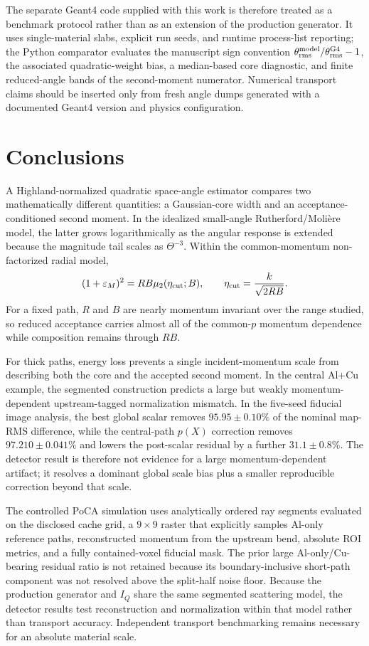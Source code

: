 \documentclass[aps,pra,reprint,longbibliography,floatfix]{revtex4-2}
\newcommand{\epsM}{\ensuremath{\varepsilon_M}}
\newcommand{\thetarms}{\ensuremath{\theta_{\mathrm{rms}}}}
\begin{document}
The separate Geant4 code supplied with this work is therefore treated as a benchmark protocol rather than as an extension of the production generator.  It uses single-material slabs, explicit run seeds, and runtime process-list reporting; the Python comparator evaluates the manuscript sign convention $\thetarms^{\rm model}/\thetarms^{\rm G4}-1$, the associated quadratic-weight bias, a median-based core diagnostic, and finite reduced-angle bands of the second-moment numerator.  Numerical transport claims should be inserted only from fresh angle dumps generated with a documented Geant4 version and physics configuration.

\section{Conclusions}
A Highland-normalized quadratic space-angle estimator compares two mathematically different quantities: a Gaussian-core width and an acceptance-conditioned second moment.  In the idealized small-angle Rutherford/Moli\`ere model, the latter grows logarithmically as the angular response is extended because the magnitude tail scales as $\Theta^{-3}$.  Within the common-momentum non-factorized radial model,
\begin{equation*}
(1+\epsM)^2=RB\mu_2(\eta_{\rm cut};B),\qquad
\eta_{\rm cut}=\frac{k}{\sqrt{2RB}}.
\end{equation*}
For a fixed path, $R$ and $B$ are nearly momentum invariant over the range studied, so reduced acceptance carries almost all of the common-$p$ momentum dependence while composition remains through $RB$.

For thick paths, energy loss prevents a single incident-momentum scale from describing both the core and the accepted second moment.  In the central Al+Cu example, the segmented construction predicts a large but weakly momentum-dependent upstream-tagged normalization mismatch.  In the five-seed fiducial image analysis, the best global scalar removes $95.95\pm0.10\%$ of the nominal map-RMS difference, while the central-path $p(X)$ correction removes $97.210\pm0.041\%$ and lowers the post-scalar residual by a further $31.1\pm0.8\%$.  The detector result is therefore not evidence for a large momentum-dependent artifact; it resolves a dominant global scale bias plus a smaller reproducible correction beyond that scale.

The controlled PoCA simulation uses analytically ordered ray segments evaluated on the disclosed cache grid, a $9\times9$ raster that explicitly samples Al-only reference paths, reconstructed momentum from the upstream bend, absolute ROI metrics, and a fully contained-voxel fiducial mask.  The prior large Al-only/Cu-bearing residual ratio is not retained because its boundary-inclusive short-path component was not resolved above the split-half noise floor.  Because the production generator and $I_Q$ share the same segmented scattering model, the detector results test reconstruction and normalization within that model rather than transport accuracy.  Independent transport benchmarking remains necessary for an absolute material scale.
\end{document}
